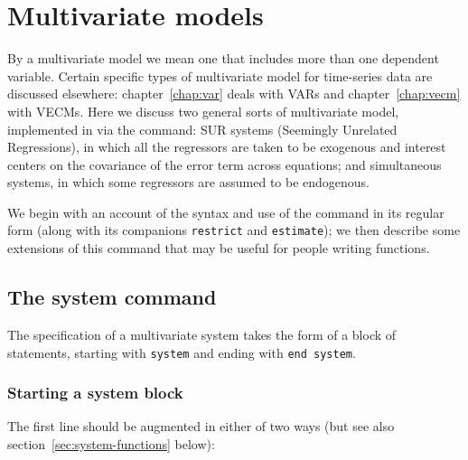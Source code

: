 \chapter{Multivariate models}
\label{chap:system}

By a multivariate model we mean one that includes more than one
dependent variable. Certain specific types of multivariate model for
time-series data are discussed elsewhere: chapter~\ref{chap:var} deals
with VARs and chapter~\ref{chap:vecm} with VECMs. Here we discuss two
general sorts of multivariate model, implemented in  via
the  command: SUR systems (Seemingly Unrelated
Regressions), in which all the regressors are taken to be exogenous
and interest centers on the covariance of the error term across
equations; and simultaneous systems, in which some regressors are
assumed to be endogenous.

We begin with an account of the syntax and use of the 
command in its regular form (along with its companions
\texttt{restrict} and \texttt{estimate}); we then describe some
extensions of this command that may be useful for people writing
functions.

\section{The system command}
\label{sec:system-regular}

The specification of a multivariate system takes the form of a block
of statements, starting with \texttt{system} and ending with
\texttt{end system}. 

\subsection{Starting a system block}

The first line should be augmented in either of two ways (but see also
section~\ref{sec:system-functions} below):

